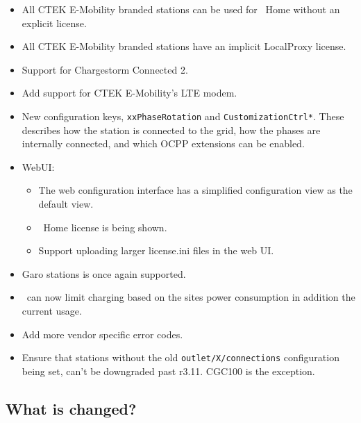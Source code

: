 \documentclass{scrartcl}
\begin{document}
\begin{itemize}
\item All CTEK E-Mobility branded stations can be used for \nanogrid\ Home
  without an explicit license.
\item All CTEK E-Mobility branded stations have an implicit LocalProxy
  license.
\item Support for Chargestorm Connected 2.
\item Add support for CTEK E-Mobility's LTE modem.
\item New configuration keys, \verb|xxPhaseRotation| and
  \verb|CustomizationCtrl*|. These describes how the station is connected to
  the grid, how the phases are internally connected, and which OCPP extensions
  can be enabled.
\item WebUI:
  \begin{itemize}
  \item The web configuration interface has a simplified configuration view as
  the default view.
  \item \nanogrid\ Home license is being shown.
  \item Support uploading larger license.ini files in the web UI.
  \end{itemize}
\item Garo stations is once again supported.
\item \nanogrid\ can now limit charging based on the sites power consumption in
  addition the current usage.
\item Add more vendor specific error codes.
\item Ensure that stations without the old \verb|outlet/X/connections|
  configuration being set, can't be downgraded past r3.11. CGC100 is the
  exception.
\end{itemize}

\subsection*{What is changed?}
\end{document}

